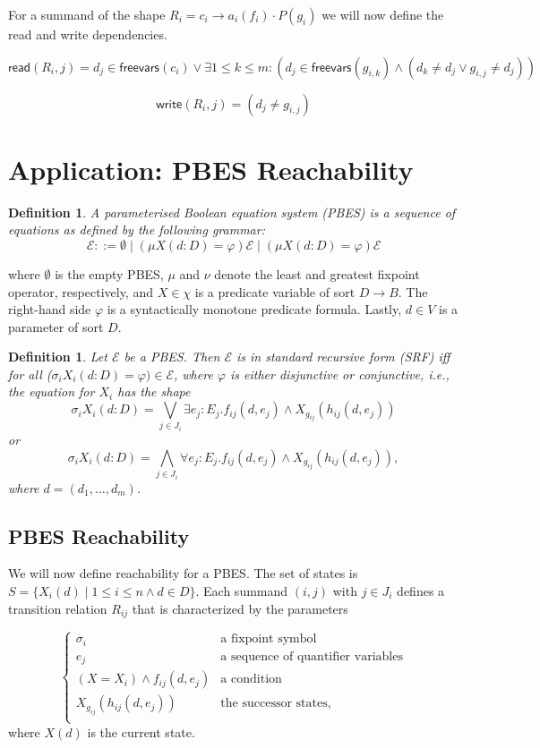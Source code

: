 \documentclass{article}
\newtheorem{definition}[theorem]{Definition}
\begin{document}
\noindent
For a summand of the shape $R_i = c_i \rightarrow a_i(f_i) \cdot P(g_i)$ we will now define the read and write dependencies.

\[
\textsf{read}(R_i, j) = 
d_j \in \textsf{freevars}(c_i) \lor
\exists 1 \leq k \leq m: (d_j \in \textsf{freevars}(g_{i,k}) \land (d_k \neq d_j \lor g_{i,j} \neq d_j))
\]

\[
\textsf{write}(R_i, j) = (d_j \neq g_{i,j})
\]

\newpage
\section{Application: PBES Reachability}

\begin{definition}
A parameterised Boolean equation system (PBES) is a sequence of equations as defined by the following grammar:
\[
\mathcal{E} ::= \emptyset \mid (\mu X(d:D) = \varphi) \mathcal{E} \mid (\mu X(d:D) = \varphi) \mathcal{E}
\]
\end{definition}
where $\emptyset$ is the empty PBES, $\mu$ and $\nu$ denote the least and greatest fixpoint operator, respectively, and $X \in \chi$ is a predicate
variable of sort $D \rightarrow B$. The right-hand side $\varphi$ is a syntactically monotone predicate formula. Lastly, $d \in V$ is a parameter of
sort $D$.

\begin{definition}
Let $\mathcal{E}$ be a PBES. Then $\mathcal{E}$ is in standard recursive form (SRF) iff for all ($\sigma_i X_i(d:D) = \varphi) \in \mathcal{E}$, where
$\varphi$ is either disjunctive or conjunctive, i.e., the equation for $X_i$ has the shape
\[
  \sigma_i X_i(d:D) = \bigvee\limits_{j \in J_i} \exists e_j: E_j . f_{ij}(d,e_j) \land X_{g_{ij}}(h_{ij}(d, e_j))
\]
or
\[
  \sigma_i X_i(d:D) = \bigwedge\limits_{j \in J_i} \forall e_j: E_j . f_{ij}(d,e_j) \land X_{g_{ij}}(h_{ij}(d, e_j)),
\]
where $d = (d_1, \ldots, d_m)$.
\end{definition}

\subsection{PBES Reachability}
We will now define reachability for a PBES.
The set of states is $S = \{ X_i(d) \mid 1 \leq i \leq n \land d \in D \}$.
Each summand $(i,j)$ with $j \in J_i$ defines a transition relation $R_{ij}$ that is characterized by the parameters

\[
\left\{
\begin{array}{ll}
    \sigma_i & \text{a fixpoint symbol} \\
    e_j & \text{a sequence of quantifier variables} \\
    (X = X_i) \land f_{ij}(d,e_j) & \text{a condition} \\
    X_{g_{ij}}(h_{ij}(d, e_j)) & \text{the successor states,} \\
\end{array}
\right.
\]
where $X(d)$ is the current state.
\end{document}
